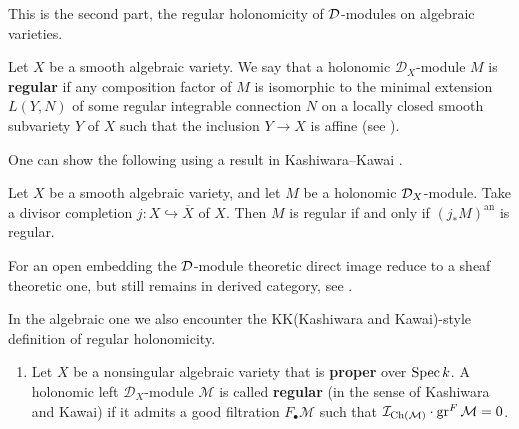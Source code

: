 \begin{remark}
    \bigskip

    This is the second part, the regular holonomicity of $\mathcal{D}$-modules on algebraic varieties.

    \begin{definition}
        \cite[Def.~6.1.1.]{hotta2008d}
        Let $X$ be a smooth algebraic variety.
        We say that a holonomic $\mathcal{D}_X$-module $M$ is \textbf{regular}
        if any composition factor of $M$ is isomorphic to the minimal extension $L(Y, N)$ of some regular integrable connection $N$
        on a locally closed smooth subvariety $Y$ of $X$ such that the inclusion $Y \to X$ is affine (see \cite[Theorem~3.4.2]{hotta2008d}).
    \end{definition}

    \begin{theorem}\label{thm:equivalence_regular_holonomic_on_algebraic_with_analytic}
        One can show the following using a result in Kashiwara--Kawai \cite{KashiwaraKawai1981HolIII}.

        Let $X$ be a smooth algebraic variety,
        and let $M$ be a holonomic $\mathcal{D}_X$-module.
        Take a divisor completion $j: X \hookrightarrow \overline{X}$ of $X$.
        Then $M$ is regular if and only if $(j_\ast M)^{\mathrm{an}}$ is regular.
    \end{theorem}

    \begin{remark}
        For an open embedding the $\mathcal{D}$-module theoretic direct image reduce to a sheaf theoretic one, but still remains in derived category,
        see \cite[Example~1.5.22.]{hotta2008d}.
    \end{remark}

    \begin{remark}\label{rmk:algebraic_KK_regularity_holomonic}
        In the algebraic one we also encounter the KK(Kashiwara and Kawai)-style definition of regular holonomicity.

        \begin{enumerate}
            \item \cite[Def.~21.2.]{schnell_dmodules_notes}
                  Let $X$ be a nonsingular algebraic variety that is \textbf{proper} over $\operatorname{Spec} k$.
                  A holonomic left $\mathcal{D}_X$-module $\mathcal{M}$ is called \textbf{regular} (in the sense of Kashiwara and Kawai)
                  if it admits a good filtration $F_\bullet \mathcal{M}$ such that $\mathcal{I}_{\operatorname{Ch}(\mathcal{M})} \cdot \operatorname{gr}^F \mathcal{M} = 0$.


\end{enumerate}
\end{remark}
\end{remark}
